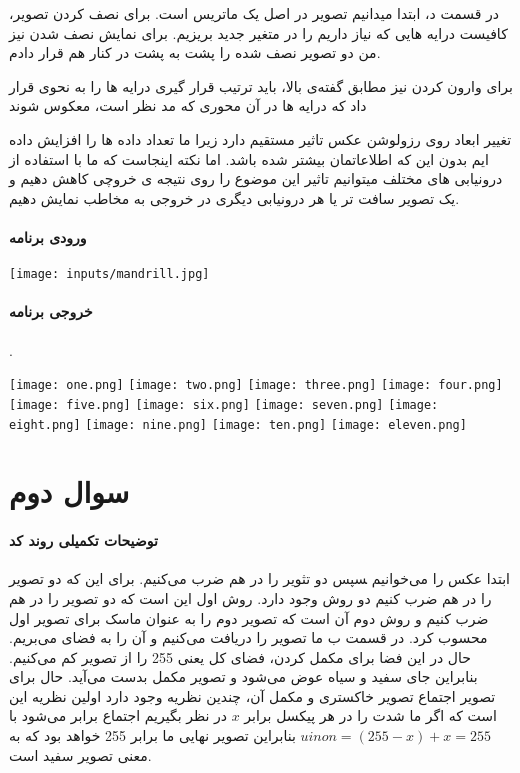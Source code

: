\documentclass[12pt]{article}
\begin{document}
		در قسمت د، ابتدا میدانیم تصویر در اصل یک ماتریس است. برای نصف کردن تصویر، کافیست درایه هایی که نیاز داریم را در متغیر جدید بریزیم. برای نمایش نصف شدن نیز من دو تصویر نصف شده را پشت به پشت در کنار هم قرار دادم.
		
	برای وارون کردن نیز مطابق گفته‌ی بالا، باید ترتیب قرار گیری درایه ها را به نحوی قرار داد که درایه ها در آن محوری که مد نظر است، معکوس شوند 
	
		تغییر ابعاد روی رزولوشن عکس تاثیر مستقیم دارد زیرا ما تعداد داده ها را افزایش داده ایم بدون این که اطلاعاتمان بیشتر شده باشد. اما نکته اینجاست که ما با استفاده از درونیابی های مختلف میتوانیم تاثیر این موضوع را روی نتیجه ی خروچی کاهش دهیم و یک تصویر سافت تر یا هر درونیابی دیگری در خروجی به مخاطب نمایش دهیم.
		\paragraph{ورودی برنامه}
		
		
	 		\texttt{[image: inputs/mandrill.jpg]}
		\paragraph{خروجی برنامه}.
		
		\texttt{[image: one.png]}
		\texttt{[image: two.png]}
 		\texttt{[image: three.png]}
 		\texttt{[image: four.png]}
 		\texttt{[image: five.png]}
 		\texttt{[image: six.png]}
 		\texttt{[image: seven.png]}
 		\texttt{[image: eight.png]}
 		\texttt{[image: nine.png]}
 		\texttt{[image: ten.png]}
 		\texttt{[image: eleven.png]}
  \newpage
  
  \section{سوال دوم}
  \paragraph{توضیحات تکمیلی روند کد}
ابتدا عکس را می‌خوانیم ‍‍سپس دو تثویر را در هم ضرب می‌کنیم.
برای این که دو تصویر را در هم ضرب کنیم دو روش وجود دارد. روش اول این است که دو تصویر را در هم ضرب کنیم و روش دوم آن است که تصویر دوم را به عنوان ماسک برای تصویر اول محسوب کرد. 
در قسمت ب
 ما تصویر را دریافت می‌کنیم و آن را به فضای 
 می‌بریم. حال در این فضا برای مکمل کردن، فضای کل یعنی 255 را از تصویر کم می‌کنیم. بنابراین جای سفید و سیاه عوض می‌شود و تصویر مکمل بدست می‌‌آید.
 حال برای تصویر اجتماع تصویر خاکستری و مکمل آن، چندین نظریه وجود دارد اولین نظریه این است که اگر ما شدت را در هر پیکسل برابر $x$ در نظر بگیریم اجتماع برابر می‌شود با 
 $uinon = (255 - x) + x = 255 $
 بنابراین تصویر نهایی ما برابر 255 خواهد بود که به معنی تصویر سفید است.
 
\end{document}
